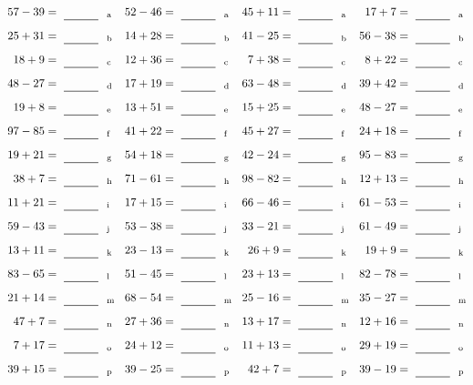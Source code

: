 \documentclass
[
  draft    = true,
  fontsize = 11pt,
  parskip  = half-
]
{scrartcl}
\begin{document}
\clearpage
\begin{align*}
    \pline{57-39}&=\rline{a}
  & \pline{52-46}&=\rline{a}
  & \pline{45+11}&=\rline{a}
  & \pline{17+7}&=\rline{a} \\[1ex]
    \pline{25+31}&=\rline{b}
  & \pline{14+28}&=\rline{b}
  & \pline{41-25}&=\rline{b}
  & \pline{56-38}&=\rline{b} \\[1ex]
    \pline{18+9}&=\rline{c}
  & \pline{12+36}&=\rline{c}
  & \pline{7+38}&=\rline{c}
  & \pline{8+22}&=\rline{c} \\[1ex]
    \pline{48-27}&=\rline{d}
  & \pline{17+19}&=\rline{d}
  & \pline{63-48}&=\rline{d}
  & \pline{39+42}&=\rline{d} \\[1ex]
    \pline{19+8}&=\rline{e}
  & \pline{13+51}&=\rline{e}
  & \pline{15+25}&=\rline{e}
  & \pline{48-27}&=\rline{e} \\[1ex]
    \pline{97-85}&=\rline{f}
  & \pline{41+22}&=\rline{f}
  & \pline{45+27}&=\rline{f}
  & \pline{24+18}&=\rline{f} \\[1ex]
    \pline{19+21}&=\rline{g}
  & \pline{54+18}&=\rline{g}
  & \pline{42-24}&=\rline{g}
  & \pline{95-83}&=\rline{g} \\[1ex]
    \pline{38+7}&=\rline{h}
  & \pline{71-61}&=\rline{h}
  & \pline{98-82}&=\rline{h}
  & \pline{12+13}&=\rline{h} \\[1ex]
    \pline{11+21}&=\rline{i}
  & \pline{17+15}&=\rline{i}
  & \pline{66-46}&=\rline{i}
  & \pline{61-53}&=\rline{i} \\[1ex]
    \pline{59-43}&=\rline{j}
  & \pline{53-38}&=\rline{j}
  & \pline{33-21}&=\rline{j}
  & \pline{61-49}&=\rline{j} \\[1ex]
    \pline{13+11}&=\rline{k}
  & \pline{23-13}&=\rline{k}
  & \pline{26+9}&=\rline{k}
  & \pline{19+9}&=\rline{k} \\[1ex]
    \pline{83-65}&=\rline{l}
  & \pline{51-45}&=\rline{l}
  & \pline{23+13}&=\rline{l}
  & \pline{82-78}&=\rline{l} \\[1ex]
    \pline{21+14}&=\rline{m}
  & \pline{68-54}&=\rline{m}
  & \pline{25-16}&=\rline{m}
  & \pline{35-27}&=\rline{m} \\[1ex]
    \pline{47+7}&=\rline{n}
  & \pline{27+36}&=\rline{n}
  & \pline{13+17}&=\rline{n}
  & \pline{12+16}&=\rline{n} \\[1ex]
    \pline{7+17}&=\rline{o}
  & \pline{24+12}&=\rline{o}
  & \pline{11+13}&=\rline{o}
  & \pline{29+19}&=\rline{o} \\[1ex]
    \pline{39+15}&=\rline{p}
  & \pline{39-25}&=\rline{p}
  & \pline{42+7}&=\rline{p}
  & \pline{39-19}&=\rline{p}
\end{align*}
\end{document}
